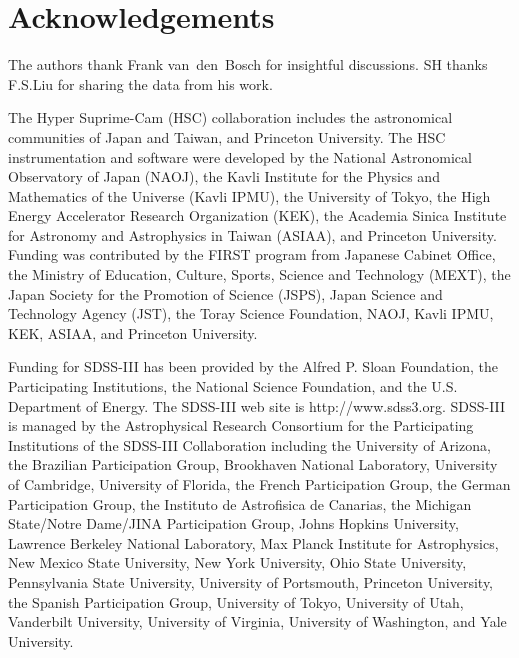\documentclass[a4paper,fleqn,usenatbib]{mnras}
\begin{document}
  
\section*{Acknowledgements}

  The authors thank Frank van~den~Bosch for insightful discussions.
  SH thanks F.S.Liu for sharing the data from his work.

  The Hyper Suprime-Cam (HSC) collaboration includes the astronomical communities of 
  Japan and Taiwan, and Princeton University.  The HSC instrumentation and software were
  developed by the National Astronomical Observatory of Japan (NAOJ), the Kavli Institute
  for the Physics and Mathematics of the Universe (Kavli IPMU), the University of Tokyo,
  the High Energy Accelerator Research Organization (KEK), the Academia Sinica Institute
  for Astronomy and Astrophysics in Taiwan (ASIAA), and Princeton University.  
  Funding was contributed by the FIRST program from Japanese Cabinet Office, the Ministry 
  of Education, Culture, Sports, Science and Technology (MEXT), the Japan Society for 
  the Promotion of Science (JSPS), Japan Science and Technology Agency (JST), the
  Toray Science Foundation, NAOJ, Kavli IPMU, KEK, ASIAA, and Princeton University.
   
  Funding for SDSS-III has been provided by the Alfred P. Sloan Foundation, the
  Participating Institutions, the National Science Foundation, and the U.S.  Department of
  Energy. The SDSS-III web site is http://www.sdss3.org.  SDSS-III is managed by the
  Astrophysical Research Consortium for the Participating Institutions of the SDSS-III
  Collaboration including the University of Arizona, the Brazilian Participation Group,
  Brookhaven National Laboratory, University of Cambridge, University of Florida, the
  French Participation Group, the German Participation Group, the Instituto de Astrofisica
  de Canarias, the Michigan State/Notre Dame/JINA Participation Group, Johns Hopkins
  University, Lawrence Berkeley National Laboratory, Max Planck Institute for
  Astrophysics, New Mexico State University, New York University, Ohio State University,
  Pennsylvania State University, University of Portsmouth, Princeton University, the
  Spanish Participation Group, University of Tokyo, University of Utah, Vanderbilt
  University, University of Virginia, University of Washington, and Yale University.
  
\end{document}
